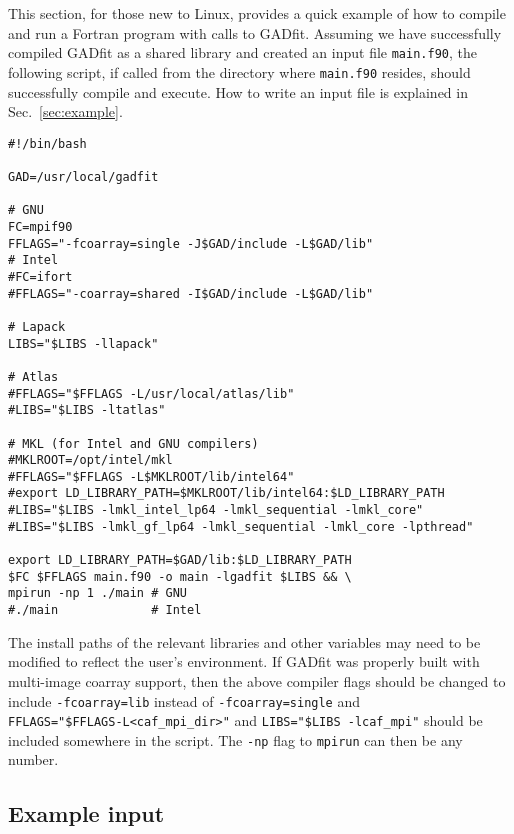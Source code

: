 \documentclass{article}
\begin{document}
This section, for those new to Linux, provides a quick example of how
to compile and run a Fortran program with calls to GADfit. Assuming we
have successfully compiled GADfit as a shared library and created an
input file \verb+main.f90+, the following script, if called from the
directory where \verb+main.f90+ resides, should successfully compile
and execute. How to write an input file is explained in
Sec.~\ref{sec:example}.
\begin{verbatim}
#!/bin/bash

GAD=/usr/local/gadfit

# GNU
FC=mpif90
FFLAGS="-fcoarray=single -J$GAD/include -L$GAD/lib"
# Intel
#FC=ifort
#FFLAGS="-coarray=shared -I$GAD/include -L$GAD/lib"

# Lapack
LIBS="$LIBS -llapack"

# Atlas
#FFLAGS="$FFLAGS -L/usr/local/atlas/lib"
#LIBS="$LIBS -ltatlas"

# MKL (for Intel and GNU compilers)
#MKLROOT=/opt/intel/mkl
#FFLAGS="$FFLAGS -L$MKLROOT/lib/intel64"
#export LD_LIBRARY_PATH=$MKLROOT/lib/intel64:$LD_LIBRARY_PATH
#LIBS="$LIBS -lmkl_intel_lp64 -lmkl_sequential -lmkl_core"
#LIBS="$LIBS -lmkl_gf_lp64 -lmkl_sequential -lmkl_core -lpthread"

export LD_LIBRARY_PATH=$GAD/lib:$LD_LIBRARY_PATH
$FC $FFLAGS main.f90 -o main -lgadfit $LIBS && \
mpirun -np 1 ./main # GNU
#./main             # Intel
\end{verbatim}
The install paths of the relevant libraries and other variables may
need to be modified to reflect the user's environment. If GADfit was
properly built with multi-image coarray support, then the above
compiler flags should be changed to include \texttt{-fcoarray=lib}
instead of \texttt{-fcoarray=single} and \\
\verb+FFLAGS="$FFLAGS-L<caf_mpi_dir>"+
and
\verb+LIBS="$LIBS -lcaf_mpi"+ should be included somewhere in the
script. The \texttt{-np} flag to \texttt{mpirun} can then be any
number.

\subsection{\label{sec:example}Example input}
\end{document}
